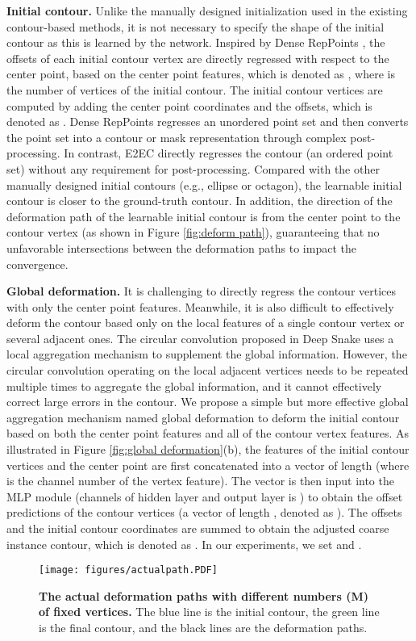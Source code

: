 \documentclass[10pt,twocolumn,letterpaper]{article}
\begin{document}
\textbf{Initial contour.} Unlike the manually designed initialization used in the existing contour-based methods, it is not necessary to specify the shape of the initial contour as this is learned by the network. Inspired by Dense RepPoints \cite{densereppoints}, the offsets of each initial contour vertex are directly regressed with respect to the center point, based on the center point features, which is denoted as , where  is the number of vertices of the initial contour. The initial contour vertices are computed by adding the center point coordinates and the offsets, which is denoted as . Dense RepPoints regresses an unordered point set and then converts the point set into a contour or mask representation through complex post-processing. In contrast, E2EC directly regresses the contour (an ordered point set) without any requirement for post-processing. Compared with the other manually designed initial contours (e.g., ellipse or octagon), the learnable initial contour is closer to the ground-truth contour. In addition, the direction of the deformation path of the learnable initial contour is from the center point to the contour vertex (as shown in Figure \ref{fig:deform path}), guaranteeing that no unfavorable intersections between the deformation paths to impact the convergence.

\textbf{Global deformation.} It is challenging to directly regress the contour vertices with only the center point features. Meanwhile, it is also difficult to effectively deform the contour based only on the local features of a single contour vertex or several adjacent ones. The circular convolution proposed in Deep Snake uses a local aggregation mechanism to supplement the global information. However, the circular convolution operating on the local adjacent vertices needs to be repeated multiple times to aggregate the global information, and it cannot effectively correct large errors in the contour. We propose a simple but more effective global aggregation mechanism named global deformation to deform the initial contour based on both the center point features and all of the contour vertex features. As illustrated in Figure \ref{fig:global deformation}(b), the features of the  initial contour vertices and the center point are first concatenated into a vector of length  (where  is the channel number of the vertex feature). The vector is then input into the MLP module (channels of hidden layer and output layer is ) to obtain the offset predictions of the contour vertices (a vector of length , denoted as ). The offsets and the initial contour coordinates are summed to obtain the adjusted coarse instance contour, which is denoted as . In our experiments, we set  and .
\begin{figure}[t]
  \centering
   \texttt{[image: figures/actualpath.PDF]}\vspace{-3mm}
   \caption{\textbf{The actual deformation paths with different numbers (M) of fixed vertices.} The blue line is the initial contour, the green line is the final contour, and the black lines are the deformation paths.}
   \label{fig:actual deform path}
   \vspace{-5mm}
\end{figure}
\end{document}
